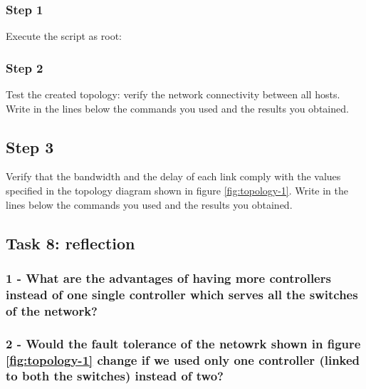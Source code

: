 \subsubsection*{Step 1}
Execute the script as root: \\

\subsubsection*{Step 2}
Test the created topology: verify the network connectivity between all hosts.
Write in the lines below the commands you used and the results you obtained.

\hrulefill

\hrulefill

\hrulefill

\hrulefill

\subsection*{Step 3}
Verify that the bandwidth and the delay of each link comply with the values
specified in the topology diagram shown in figure \ref{fig:topology-1}.
Write in the lines below the commands you used and the results you obtained.

\hrulefill

\hrulefill

\hrulefill

\hrulefill




\subsection*{Task 8: reflection}
\subsubsection*{1 - What are the advantages of having more controllers instead of one
single controller which serves all the switches of the network?}
\hrulefill

\hrulefill

\hrulefill

\hrulefill

\subsubsection*{2 - Would the fault tolerance of the netowrk shown in figure
\ref{fig:topology-1} change if we used only one controller (linked to both the
switches) instead of two?}
\hrulefill

